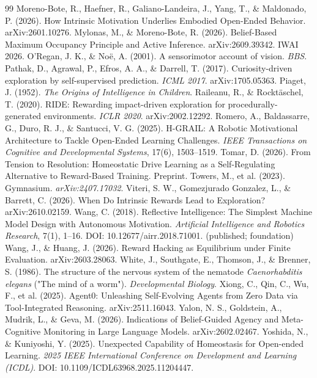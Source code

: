 \documentclass[11pt]{article}
\begin{document}
\begin{thebibliography}{99}
Moreno-Bote, R., Haefner, R., Galiano-Landeira, J., Yang, T., \& Maldonado, P. (2026). How Intrinsic Motivation Underlies Embodied Open-Ended Behavior. arXiv:2601.10276.
Mylonas, M., \& Moreno-Bote, R. (2026). Belief-Based Maximum Occupancy Principle and Active Inference. arXiv:2609.39342. IWAI 2026.
O'Regan, J. K., \& Noë, A. (2001). A sensorimotor account of vision. \emph{BBS}.
Pathak, D., Agrawal, P., Efros, A. A., \& Darrell, T. (2017). Curiosity-driven exploration by self-supervised prediction. \emph{ICML 2017}. arXiv:1705.05363.
Piaget, J. (1952). \emph{The Origins of Intelligence in Children}.
Raileanu, R., \& Rocktäschel, T. (2020). RIDE: Rewarding impact-driven exploration for procedurally-generated environments. \emph{ICLR 2020}. arXiv:2002.12292.
Romero, A., Baldassarre, G., Duro, R. J., \& Santucci, V. G. (2025). H-GRAIL: A Robotic Motivational Architecture to Tackle Open-Ended Learning Challenges. \emph{IEEE Transactions on Cognitive and Developmental Systems}, 17(6), 1503–1519.
Tomar, D. (2026). From Tension to Resolution: Homeostatic Drive Learning as a Self-Regulating Alternative to Reward-Based Training. Preprint.
Towers, M., et al. (2023). Gymnasium. \emph{arXiv:2407.17032}.
Viteri, S. W., Gomezjurado Gonzalez, L., \& Barrett, C. (2026). When Do Intrinsic Rewards Lead to Exploration? arXiv:2610.02159.
Wang, C. (2018). Reflective Intelligence: The Simplest Machine Model Design with Autonomous Motivation. \emph{Artificial Intelligence and Robotics Research}, 7(1), 1–16. DOI: 10.12677/airr.2018.71001. (published; foundation)
Wang, J., \& Huang, J. (2026). Reward Hacking as Equilibrium under Finite Evaluation. arXiv:2603.28063.
White, J., Southgate, E., Thomson, J., \& Brenner, S. (1986). The structure of the nervous system of the nematode \emph{Caenorhabditis elegans} ("The mind of a worm"). \emph{Developmental Biology}.
Xiong, C., Qin, C., Wu, F., et al. (2025). Agent0: Unleashing Self-Evolving Agents from Zero Data via Tool-Integrated Reasoning. arXiv:2511.16043.
Yalon, N. S., Goldstein, A., Mudrik, L., \& Geva, M. (2026). Indications of Belief-Guided Agency and Meta-Cognitive Monitoring in Large Language Models. arXiv:2602.02467.
Yoshida, N., \& Kuniyoshi, Y. (2025). Unexpected Capability of Homeostasis for Open-ended Learning. \emph{2025 IEEE International Conference on Development and Learning (ICDL)}. DOI: 10.1109/ICDL63968.2025.11204447.

\end{thebibliography}
\end{document}
